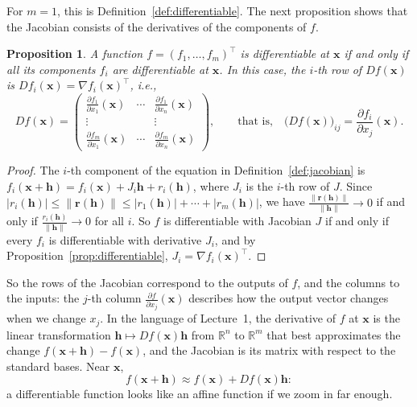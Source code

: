 \documentclass[11pt]{article}
\newcommand{\norm}[1]{\lVert #1 \rVert}
\theoremstyle{definition}
\theoremstyle{plain}
\newtheorem{proposition}[definition]{Proposition}
\theoremstyle{remark}
\begin{document}
For $m = 1$, this is Definition~\ref{def:differentiable}. The next proposition shows that the Jacobian consists of the derivatives of the components of $f$.

\begin{proposition}\label{prop:jacobian-entries}
    A function $f = (f_1, \ldots, f_m)^\top$ is differentiable at $\mathbf{x}$ if and only if all its components $f_i$ are differentiable at $\mathbf{x}$. In this case, the $i$-th row of $Df(\mathbf{x})$ is $Df_i(\mathbf{x}) = \nabla f_i(\mathbf{x})^\top$, i.e.,
    \[Df(\mathbf{x}) = \begin{pmatrix} \frac{\partial f_1}{\partial x_1}(\mathbf{x}) & \cdots & \frac{\partial f_1}{\partial x_n}(\mathbf{x}) \\ \vdots & & \vdots \\ \frac{\partial f_m}{\partial x_1}(\mathbf{x}) & \cdots & \frac{\partial f_m}{\partial x_n}(\mathbf{x}) \end{pmatrix}, \qquad \text{that is,} \quad \big(Df(\mathbf{x})\big)_{ij} = \frac{\partial f_i}{\partial x_j}(\mathbf{x}).\]
\end{proposition}

\begin{proof}
    The $i$-th component of the equation in Definition~\ref{def:jacobian} is $f_i(\mathbf{x} + \mathbf{h}) = f_i(\mathbf{x}) + J_i\mathbf{h} + r_i(\mathbf{h})$, where $J_i$ is the $i$-th row of $J$. Since $|r_i(\mathbf{h})| \leq \norm{\mathbf{r}(\mathbf{h})} \leq |r_1(\mathbf{h})| + \cdots + |r_m(\mathbf{h})|$, we have $\frac{\norm{\mathbf{r}(\mathbf{h})}}{\norm{\mathbf{h}}} \to 0$ if and only if $\frac{r_i(\mathbf{h})}{\norm{\mathbf{h}}} \to 0$ for all $i$. So $f$ is differentiable with Jacobian $J$ if and only if every $f_i$ is differentiable with derivative $J_i$, and by Proposition~\ref{prop:differentiable}, $J_i = \nabla f_i(\mathbf{x})^\top$.
\end{proof}

So the rows of the Jacobian correspond to the outputs of $f$, and the columns to the inputs: the $j$-th column $\frac{\partial f}{\partial x_j}(\mathbf{x})$ describes how the output vector changes when we change $x_j$. In the language of Lecture~1, the derivative of $f$ at $\mathbf{x}$ is the linear transformation $\mathbf{h} \mapsto Df(\mathbf{x})\mathbf{h}$ from $\mathbb{R}^n$ to $\mathbb{R}^m$ that best approximates the change $f(\mathbf{x} + \mathbf{h}) - f(\mathbf{x})$, and the Jacobian is its matrix with respect to the standard bases. Near $\mathbf{x}$,
\[f(\mathbf{x} + \mathbf{h}) \approx f(\mathbf{x}) + Df(\mathbf{x})\mathbf{h}:\]
a differentiable function looks like an affine function if we zoom in far enough.
\end{document}
